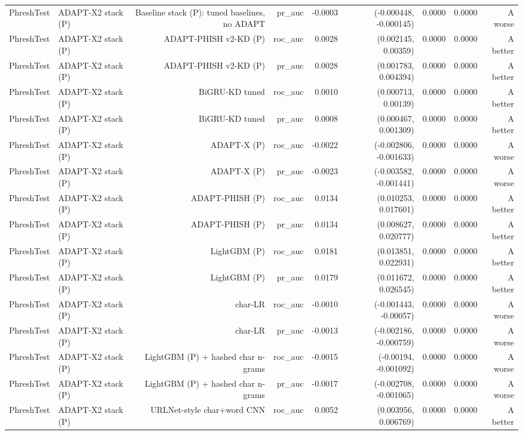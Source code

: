 \begin{table}[t]
\begin{tabular}{llrrrrrrr}
PhreshTest & ADAPT-X2 stack (P) & Baseline stack (P): tuned baselines, no ADAPT & pr\_auc & -0.0003 & (-0.000448, -0.000145) & 0.0000 & 0.0000 & A worse \\
PhreshTest & ADAPT-X2 stack (P) & ADAPT-PHISH v2-KD (P) & roc\_auc & 0.0028 & (0.002145, 0.00359) & 0.0000 & 0.0000 & A better \\
PhreshTest & ADAPT-X2 stack (P) & ADAPT-PHISH v2-KD (P) & pr\_auc & 0.0028 & (0.001783, 0.004394) & 0.0000 & 0.0000 & A better \\
PhreshTest & ADAPT-X2 stack (P) & BiGRU-KD tuned & roc\_auc & 0.0010 & (0.000713, 0.00139) & 0.0000 & 0.0000 & A better \\
PhreshTest & ADAPT-X2 stack (P) & BiGRU-KD tuned & pr\_auc & 0.0008 & (0.000467, 0.001309) & 0.0000 & 0.0000 & A better \\
PhreshTest & ADAPT-X2 stack (P) & ADAPT-X (P) & roc\_auc & -0.0022 & (-0.002806, -0.001633) & 0.0000 & 0.0000 & A worse \\
PhreshTest & ADAPT-X2 stack (P) & ADAPT-X (P) & pr\_auc & -0.0023 & (-0.003582, -0.001441) & 0.0000 & 0.0000 & A worse \\
PhreshTest & ADAPT-X2 stack (P) & ADAPT-PHISH (P) & roc\_auc & 0.0134 & (0.010253, 0.017601) & 0.0000 & 0.0000 & A better \\
PhreshTest & ADAPT-X2 stack (P) & ADAPT-PHISH (P) & pr\_auc & 0.0134 & (0.008627, 0.020777) & 0.0000 & 0.0000 & A better \\
PhreshTest & ADAPT-X2 stack (P) & LightGBM (P) & roc\_auc & 0.0181 & (0.013851, 0.022931) & 0.0000 & 0.0000 & A better \\
PhreshTest & ADAPT-X2 stack (P) & LightGBM (P) & pr\_auc & 0.0179 & (0.011672, 0.026545) & 0.0000 & 0.0000 & A better \\
PhreshTest & ADAPT-X2 stack (P) & char-LR & roc\_auc & -0.0010 & (-0.001443, -0.00057) & 0.0000 & 0.0000 & A worse \\
PhreshTest & ADAPT-X2 stack (P) & char-LR & pr\_auc & -0.0013 & (-0.002186, -0.000759) & 0.0000 & 0.0000 & A worse \\
PhreshTest & ADAPT-X2 stack (P) & LightGBM (P) + hashed char n-grams & roc\_auc & -0.0015 & (-0.00194, -0.001092) & 0.0000 & 0.0000 & A worse \\
PhreshTest & ADAPT-X2 stack (P) & LightGBM (P) + hashed char n-grams & pr\_auc & -0.0017 & (-0.002708, -0.001065) & 0.0000 & 0.0000 & A worse \\
PhreshTest & ADAPT-X2 stack (P) & URLNet-style char+word CNN & roc\_auc & 0.0052 & (0.003956, 0.006769) & 0.0000 & 0.0000 & A better \\

\end{tabular}
\end{table}
